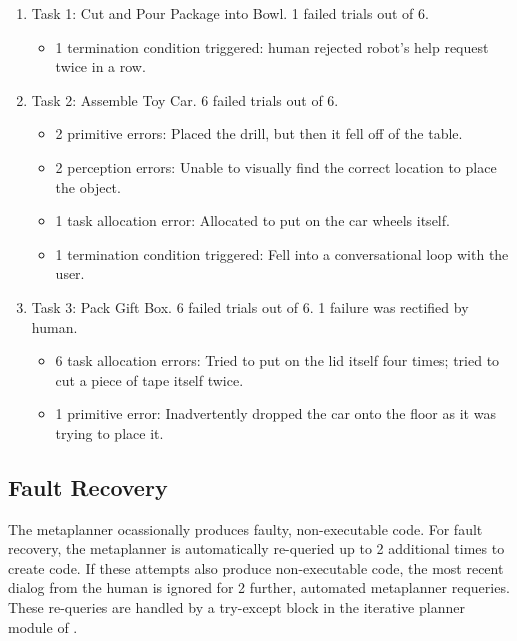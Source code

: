\begin{enumerate}
    \item Task 1: Cut and Pour Package into Bowl. 1 failed trials out of 6.
        \begin{itemize}
            \item 1 termination condition triggered: human rejected robot's help request twice in a row.
        \end{itemize}
    \item Task 2: Assemble Toy Car. 6 failed trials out of 6.
        \begin{itemize}
            \item 2 primitive errors: Placed the drill, but then it fell off of the table.
            \item 2 perception errors: Unable to visually find the correct location to place the object.
            \item 1 task allocation error: Allocated to put on the car wheels itself.
            \item 1 termination condition triggered: Fell into a conversational loop with the user.
        \end{itemize}
    \item Task 3: Pack Gift Box. 6 failed trials out of 6. 1 failure was rectified by human.
        \begin{itemize}
            \item 6 task allocation errors: Tried to put on the lid itself four times; tried to cut a piece of tape itself twice.
            \item 1 primitive error: Inadvertently dropped the car onto the floor as it was trying to place it.
        \end{itemize}
\end{enumerate}

\subsection{Fault Recovery}
\label{app:fault-recovery}
The metaplanner ocassionally produces faulty, non-executable code. For fault recovery, the metaplanner is automatically re-queried up to 2 additional times to create code. If these attempts also produce non-executable code, the most recent dialog from the human is ignored for 2 further, automated metaplanner requeries. These re-queries are handled by a try-except block in the iterative planner module of \ours{}.

